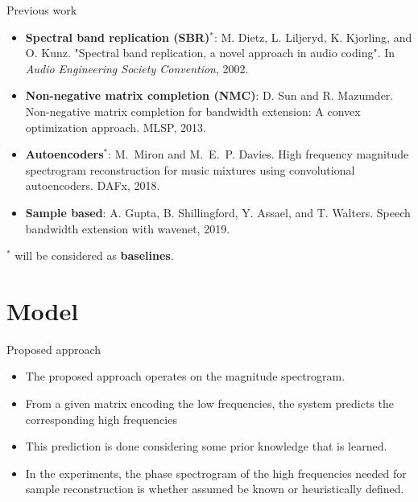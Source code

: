 \documentclass[compress]{beamer}
\begin{document}
\begin{frame}{Previous work}
  \begin{itemize}
    \item \textbf{Spectral band replication (SBR)$^*$}: M. Dietz, L. Liljeryd, K. Kjorling, and O. Kunz. "Spectral band replication, a novel approach in audio coding". In {\em Audio Engineering Society Convention}, 2002.
    \item \textbf{Non-negative matrix completion (NMC)}: D. Sun and R. Mazumder. Non-negative matrix completion for bandwidth extension: A convex optimization approach. MLSP, 2013.
    \item \textbf{Autoencoders$^*$}: M.~Miron and M.~E.~P. Davies. High frequency magnitude spectrogram reconstruction for music
      mixtures using convolutional autoencoders. DAFx, 2018.
    \item \textbf{Sample based}: A. Gupta, B. Shillingford, Y. Assael, and T. Walters. Speech bandwidth extension with wavenet, 2019.
  \end{itemize}
  $^*$ will be considered as \textbf{baselines}.
\end{frame}



\section{Model}

\begin{frame}{Proposed approach}

  \begin{itemize}
    \item The proposed approach operates on the magnitude spectrogram.
    \item From a given matrix encoding the low frequencies, the system predicts the corresponding high frequencies
    \item This prediction is done considering some prior knowledge that is learned.
    \item In the experiments, the phase spectrogram of the high frequencies needed for sample reconstruction is whether assumed be known or heuristically defined.
  \end{itemize}
\end{frame}
\end{document}
